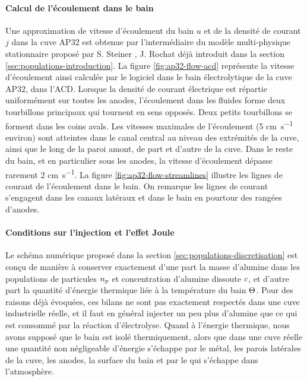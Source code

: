 \paragraph{Calcul de l'écoulement dans le bain} Une approximation de vitesse
d'écoulement du bain $u$ et de la densité de courant $j$ dans la cuve
AP32 est obtenue par l'intermédiaire du modèle multi-physique
stationnaire proposé par S. Steiner \cite{Steiner2009}, J. Rochat
\cite{Rochat2016} déjà introduit dans la section
\ref{sec:populations-introduction}. La figure \ref{fig:ap32-flow-acd}
représente la vitesse d'écoulement ainsi calculée par le logiciel
\citealucell dans le bain électrolytique de la cuve AP32, dans
l'ACD. Lorsque la densité de courant électrique est répartie
uniformément sur toutes les anodes, l'écoulement dans les fluides
forme deux tourbillons principaux qui tournent en sens opposés. Deux
petits tourbillons se forment dans les coins avals. Les vitesses
maximales de l'écoulement (\num{5} \si{\centi\meter\per\second}
environ) sont atteintes dans le canal central au niveau des extrémités
de la cuve, ainsi que le long de la paroi amont, de part et d'autre de
la cuve. Dans le reste du bain, et en particulier sous les anodes, la
vitesse d'écoulement dépasse rarement \num{2}
\si{\centi\meter\per\second}. La figure
\ref{fig:ap32-flow-streamlines} illustre les lignes de courant de
l'écoulement dans le bain. On remarque les lignes de courant
s'engagent dans les canaux latéraux et dans le bain en
pourtour des rangées d'anodes.

\paragraph{Conditions sur l'injection et l'effet Joule}
Le schéma numérique proposé dans la section
\ref{sec:populations-discretisation} est conçu de manière à conserver
exactement d'une part la masse d'alumine dans les populations de
particules $n_p$ et concentration d'alumine dissoute
$c$, et d'autre part la quantité d'énergie thermique liée
à la température du bain $\Theta$. Pour des raisons déjà
évoquées, ces bilans ne sont pas exactement respectés dans une cuve
industrielle réelle, et il faut en général injecter un peu plus d'alumine
que ce qui est consommé par la réaction d'électrolyse. Quand à
l'énergie thermique, nous avons supposé que le bain est isolé
thermiquement, alors que dans une cuve réelle une quantité non
négligeable d'énergie s'échappe par le métal, les parois latérales de
la cuve, les anodes, la surface du bain et par le  qui
s'échappe dans l'atmosphère.

